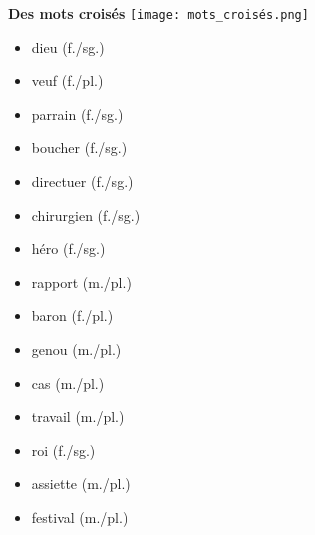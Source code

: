 \documentclass{article}
\date{}
\begin{document}
  \centering
  {\Large \textbf{Des mots croisés}}
  \texttt{[image: mots\_croisés.png]}
  \parbox[t]{0.49\textwidth}{
    \begin{itemize}
      \item dieu (f./sg.)
      \item veuf (f./pl.)
      \item parrain (f./sg.)
      \item boucher (f./sg.)
      \item directuer (f./sg.)
      \item chirurgien (f./sg.)
      \item héro (f./sg.)
      \item rapport (m./pl.)
    \end{itemize}
  }
  \parbox[t]{0.49\textwidth}{
    \begin{itemize}
      \item baron (f./pl.)
      \item genou (m./pl.)
      \item cas (m./pl.)
      \item travail (m./pl.)
      \item roi (f./sg.)
      \item assiette (m./pl.)
      \item festival (m./pl.)
    \end{itemize}
  }
\end{document}

